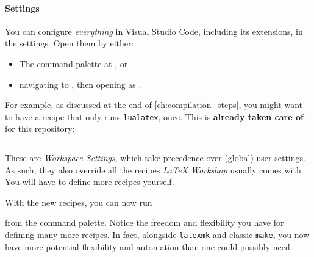 \paragraph{Settings}
You can configure \emph{everything} in Visual Studio Code, including its extensions, in the settings.
Open them by either:
\begin{itemize}
    \item The command palette at , or
    \item navigating to , then opening as .
\end{itemize}
For example, as discussed at the end of \cref{ch:compilation_steps}, you might want to have a recipe that only runs \texttt{lualatex}, once.
This is \textbf{already taken care of} for this repository:
\inputminted{json}{./.vscode/settings.json}
These are \emph{Workspace Settings}, which \href{https://code.visualstudio.com/docs/getstarted/settings}{take precedence over (global) user settings}.
As such, they also override all the recipes \emph{LaTeX Workshop} usually comes with.
You will have to define more recipes yourself.

With the new recipes, you can now run
\begin{center}
\end{center}
from the command palette.
Notice the freedom and flexibility you have for defining many more recipes.
In fact, alongside \texttt{latexmk} and classic \texttt{make}, you now have more potential flexibility and automation than one could possibly need.

